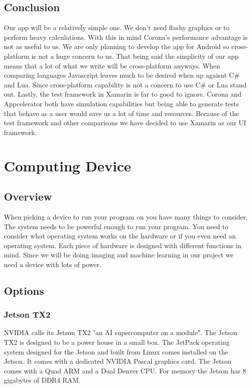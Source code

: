 \documentclass[onecolumn, draftclsnofoot,10pt, compsoc]{IEEEtran}
\begin{document}
	\subsection{Conclusion}
		Our app will be a relatively simple one.
		We don't need flashy graphics or to perform heavy calculations.
		With this in mind Corona's performance advantage is not as useful to us.
		We are only planning to develop the app for Android so cross-platform is not a huge concern to us.
		That being said the simplicity of our app means that a lot of what we write will be cross-platform anyways.
		When comparing languages Javascript leaves much to be desired when up agaisnt C\# and Lua.
		Since cross-platform capability is not a concern to use C\# or Lua stand out.
		Lastly, the test framework in Xamarin is far to good to ignore.
		Corona and Appcelerator both have simulation capabilities but being able to generate tests that behave as a user would save us a lot of time and resources.
		Because of the test framework and other comparisons we have decided to use Xamarin as our UI framework.

\section{Computing Device}
	\subsection{Overview}
		When picking a device to run your program on you have many things to consider.
		The system needs to be powerful enough to run your program.
		You need to consider what operating system works on the hardware or if you even need an operating system.
		Each piece of hardware is designed with different functions in mind.
		Since we will be doing imaging and machine learning in our project we need a device with lots of power.

	\subsection{Options}
		\subsubsection{Jetson TX2}
			NVIDIA calls its Jetson TX2 "an AI supercomputer on a module"\cite{jetson_dev_kit}.
			The Jetson TX2 is designed to be a power house in a small box.
			The JetPack operating system designed for the Jetson and built from Linux comes installed on the Jetson\cite{jetson_dev_kit_guide}.
			It comes with a dedicated NVIDIA Pascal graphics card.
			The Jetson comes with a Quad ARM and a Dual Denver CPU.
			For memory the Jetson has 8 gigabytes of DDR4 RAM\cite{jetson_dev_kit}.
\end{document}
